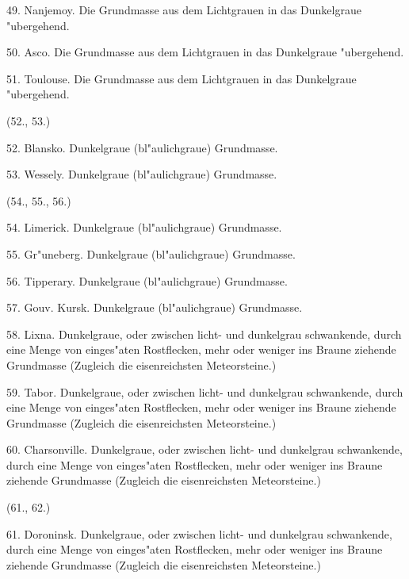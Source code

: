 \documentclass[a4paper, 11pt, oneside, polutonikogreek, german]{article}
\begin{document}
49. Nanjemoy. Die Grundmasse aus dem Lichtgrauen in das Dunkelgraue "ubergehend.

50. Asco. Die Grundmasse aus dem Lichtgrauen in das Dunkelgraue "ubergehend.

\vspace{2ex}

51. Toulouse. Die Grundmasse aus dem Lichtgrauen in das Dunkelgraue "ubergehend.

\begin{center}
(52., 53.)
\end{center}

52. Blansko. Dunkelgraue (bl"aulichgraue) Grundmasse.

53. Wessely. Dunkelgraue (bl"aulichgraue) Grundmasse.

\begin{center}
(54., 55., 56.)
\end{center}

54. Limerick. Dunkelgraue (bl"aulichgraue) Grundmasse.

55. Gr"uneberg. Dunkelgraue (bl"aulichgraue) Grundmasse.

56. Tipperary. Dunkelgraue (bl"aulichgraue) Grundmasse.

\vspace{2ex}

57. Gouv. Kursk. Dunkelgraue (bl"aulichgraue) Grundmasse.

58. Lixna. Dunkelgraue, oder zwischen licht- und dunkelgrau schwankende, durch eine Menge von einges"aten Rostflecken, mehr oder weniger ins Braune ziehende Grundmasse (Zugleich die eisenreichsten Meteorsteine.)

59. Tabor. Dunkelgraue, oder zwischen licht- und dunkelgrau schwankende, durch eine Menge von einges"aten Rostflecken, mehr oder weniger ins Braune ziehende Grundmasse (Zugleich die eisenreichsten Meteorsteine.)

60. Charsonville. Dunkelgraue, oder zwischen licht- und dunkelgrau schwankende, durch eine Menge von einges"aten Rostflecken, mehr oder weniger ins Braune ziehende Grundmasse (Zugleich die eisenreichsten Meteorsteine.)

\begin{center}
(61., 62.)
\end{center}

61. Doroninsk. Dunkelgraue, oder zwischen licht- und dunkelgrau schwankende, durch eine Menge von einges"aten Rostflecken, mehr oder weniger ins Braune ziehende Grundmasse (Zugleich die eisenreichsten Meteorsteine.)
\end{document}

